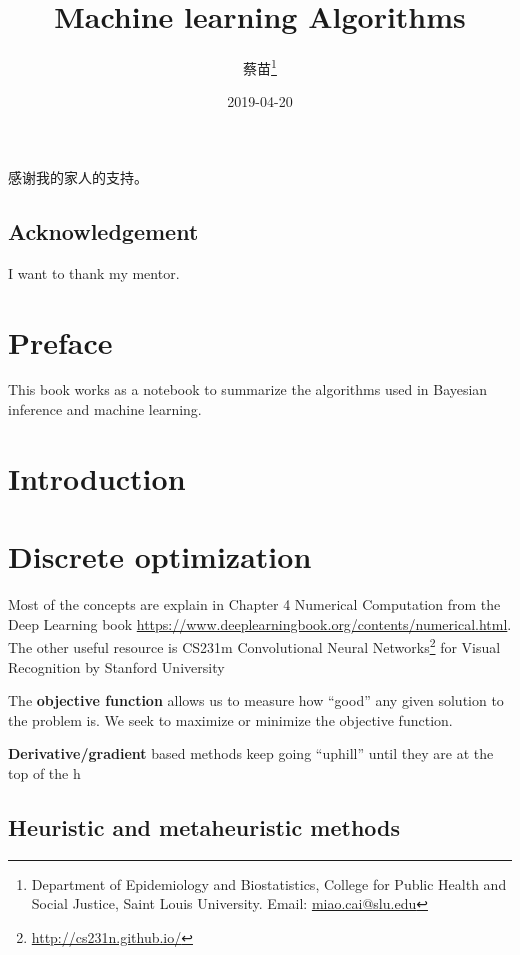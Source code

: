 \documentclass[fontset=fandol,zihao=false,scheme=chinese,heading=true,UTF8]{ctexbook}
\title{{\fontsize{26}{30}\selectfont \textbf{Machine learning Algorithms}}}
\author{蔡苗\footnote{Department of Epidemiology and Biostatistics, College for Public Health and Social Justice, Saint Louis University. Email: \url{miao.cai@slu.edu}}}
\date{2019-04-20}
\newenvironment{dedication}
{
   \cleardoublepage
   \thispagestyle{empty}
   \vspace*{\stretch{1}}
   \hfill\begin{minipage}[t]{0.66\textwidth}
   \raggedright
}
{
   \end{minipage}
   \vspace*{\stretch{3}}
   \clearpage
}
\renewcommand{\href}[2]{#2\footnote{\url{#1}}}
\begin{document}
\maketitle

\begin{dedication}
感谢我的家人的支持。
\end{dedication}

\section*{Acknowledgement}

I want to thank my mentor.

{
\setcounter{tocdepth}{2}
\tableofcontents
}
\listoftables
\listoffigures



\hypertarget{preface}{%
\chapter{Preface}\label{preface}}

This book works as a notebook to summarize the algorithms used in Bayesian inference and machine learning.

\mainmatter

\hypertarget{introduction}{%
\chapter{Introduction}\label{introduction}}

\hypertarget{discrete-optimization}{%
\chapter{Discrete optimization}\label{discrete-optimization}}

Most of the concepts are explain in Chapter 4 Numerical Computation from the Deep Learning book \url{https://www.deeplearningbook.org/contents/numerical.html}.
The other useful resource is \href{http://cs231n.github.io/}{CS231m Convolutional Neural Networks} for Visual Recognition by Stanford University

The \textbf{objective function} allows us to measure how ``good'' any given solution to the problem is.
We seek to maximize or minimize the objective function.

\textbf{Derivative/gradient} based methods keep going ``uphill'' until they are at the top of the h

\hypertarget{heuristic-and-metaheuristic-methods}{%
\section{Heuristic and metaheuristic methods}\label{heuristic-and-metaheuristic-methods}}
\end{document}
